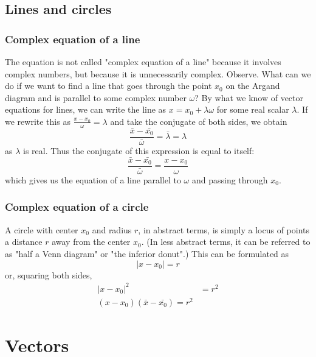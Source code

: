 \documentclass{article}
\begin{document}
\subsection{Lines and circles}
\subsubsection{Complex equation of a line}
The equation is not called "complex equation of a line" because it involves complex numbers, but because it is unnecessarily complex. Observe. What can we do if we want to find a line that goes through the point $x_0$ on the Argand diagram and is parallel to some complex number $\omega$? By what we know of vector equations for lines, we can write the line as $x = x_0 + \lambda \omega$ for some real scalar $\lambda$. If we rewrite this as $\frac{x-x_0}{\omega}=\lambda$ and take the conjugate of both sides, we obtain
\begin{equation*}
    \frac{\bar{x}-\bar{x_0}}{\bar{\omega}}=\bar{\lambda}=\lambda
\end{equation*}
as $\lambda$ is real. Thus the conjugate of this expression is equal to itself:
\begin{equation*}
    \frac{\bar{x}-\bar{x_0}}{\bar{\omega}}=\frac{x-x_0}{\omega}
\end{equation*}
which gives us the equation of a line parallel to $\omega$ and passing through $x_0$. 
\subsubsection{Complex equation of a circle}
A circle with center $x_0$ and radius $r$, in abstract terms, is simply a locus of points a distance $r$ away from the center $x_0$. (In less abstract terms, it can be referred to as "half a Venn diagram" or "the inferior donut".) This can be formulated as 
\begin{equation*}
    |x-x_0|=r
\end{equation*}
or, squaring both sides,
\begin{equation*}
    \begin{aligned}
        |x-x_0|^2&=r^2 \\
        (x-x_0)(\bar{x}-\bar{x_0})=r^2
    \end{aligned}
\end{equation*}
\newpage
\section{Vectors}
\end{document}
